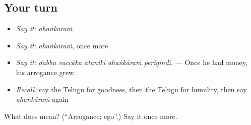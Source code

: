 \subsection*{Your turn}
\begin{itemize}
\raggedright
  \item \emph{Say it:} \emph{ahaṅkāraṁ}
  \item \emph{Say it:} \emph{ahaṅkāraṁ}, once more
  \item \emph{Say it:} \emph{ḍabbu vaccāka ataniki ahaṅkāraṁ perigindi.} — Once he had money, his arrogance grew.
  \item \emph{Recall:} say the Telugu for goodness, then the Telugu for humility, then say \emph{ahaṅkāraṁ} again
\end{itemize}

\begin{tcolorbox}[breakable,colback=teal!4,colframe=teal!35!black,title={Before you move on}]
What does  mean? (\textquotedblleft{}Arrogance; ego\textquotedblright{}.) Say it once more.
\end{tcolorbox}
